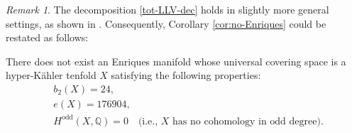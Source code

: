 \documentclass[a4paper,11pt]{amsart}
\theoremstyle{plain}
\theoremstyle{remark}
\newtheorem{remark}[subsection]{Remark}
\begin{document}
\begin{remark}
The decomposition \eqref{tot-LLV-dec} holds in slightly more general settings, as shown in \cite[Theorem 3.26]{GKLR}. Consequently, Corollary \ref{cor:no-Enriques} could be restated as follows:

There does not exist an Enriques manifold whose universal covering space is a hyper-Kähler tenfold \(X\) satisfying the following properties:
\begin{align*}
    &b_2(X) = 24, \\
    &e(X) = 176904, \\
    &H^{\mathrm{odd}}(X, \mathbb{Q}) = 0 \quad \text{(i.e., \(X\) has no cohomology in odd degree)}.
\end{align*}
\end{remark}


\end{document}
